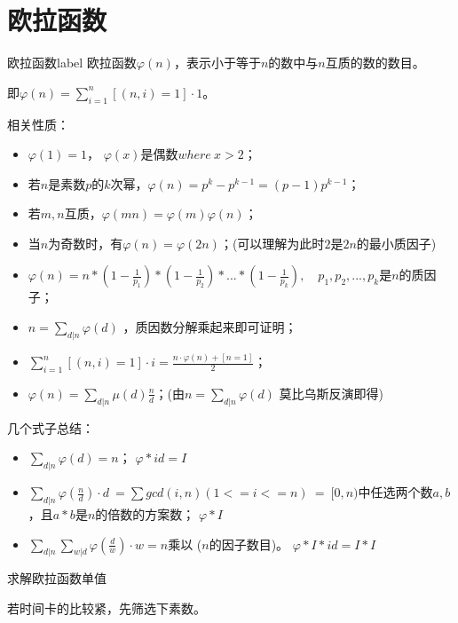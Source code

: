 \section{欧拉函数}
\begin{definition}{欧拉函数}{label}
欧拉函数$\varphi(n)$，表示小于等于$n$的数中与$n$互质的数的数目。

即$\varphi(n)=\sum_{i=1}^{n}{[(n,i)=1]\cdot 1}$。
\end{definition}

相关性质：
\begin{itemize}
\item $\varphi(1)=1$， $\varphi(x)$是偶数$where \ x>2$；
\item 若$n$是素数$p$的$k$次幂，$\varphi(n)=p^k-p^{k-1}=(p-1)p^{k-1}$；
\item 若$m,n$互质，$\varphi(mn)=\varphi(m)\varphi(n)$；
\item 当$n$为奇数时，有$\varphi(n)=\varphi(2n)$；{\heiti (可以理解为此时$2$是$2n$的最小质因子)}
\item $\varphi(n)=n*(1-\frac{1}{p_1})*(1-\frac{1}{p_2})*...*(1-\frac{1}{p_k}),\quad p_1,p_2,...,p_k$是$n$的质因子；
\item $n=\sum_{d|n}{\varphi(d)}$ ，质因数分解乘起来即可证明；
\item $\sum_{i=1}^{n}{[(n,i)=1]\cdot i}=\frac{n\cdot\varphi(n)+[n=1]}{2}$；
\item $\varphi(n)=\sum_{d|n}{\mu(d)\frac{n}{d}}$；{\heiti (由$n=\sum_{d|n}{\varphi(d)}$ 莫比乌斯反演即得)}
\end{itemize}

\vbox{}

几个式子总结：
\begin{itemize}
\item $\sum_{d|n}\varphi(d)=n$；{\color{red} $\varphi * id = I$}
\item $\sum_{d|n}\varphi(\frac{n}{d})\cdot d\ =\sum gcd(i, n)(1<=i <=n)\ =\ $$[0,n)$中任选两个数$a,b$，且$a*b$是$n$的倍数的方案数；    {\color{red} $\varphi * I$}
\item $\sum_{d|n}\sum_{w|d}\varphi(\frac{d}{w})\cdot w=n $乘以 ($n$的因子数目)。  {\color{red} $\varphi * I * id = I * I$}
\end{itemize}

\vbox{}

{\heiti 求解欧拉函数单值}

若时间卡的比较紧，先筛选下素数。



